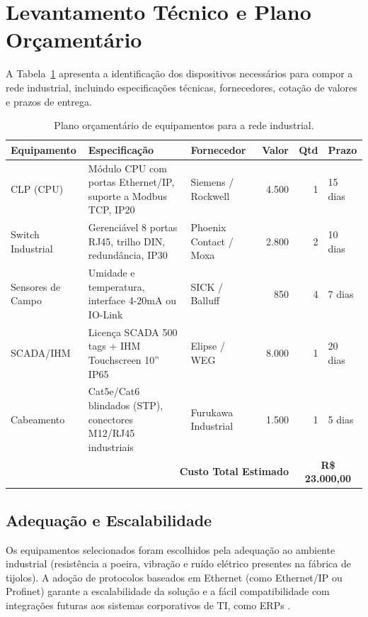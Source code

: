 \documentclass[12pt,a4paper,oneside]{article}
\begin{document}
\section{Levantamento Técnico e Plano Orçamentário}

A Tabela~\ref{tab:orcamento} apresenta a identificação dos dispositivos necessários para compor a rede industrial, incluindo especificações técnicas, fornecedores, cotação de valores e prazos de entrega.

\begin{table}[htb]
  \centering
  \caption{Plano orçamentário de equipamentos para a rede industrial.}
  \label{tab:orcamento}
  \begin{tabular}{p{3cm}p{4cm}p{2.5cm}r r p{2cm}}
    \toprule
    \textbf{Equipamento} & \textbf{Especificação} & \textbf{Fornecedor} & \textbf{Valor} & \textbf{Qtd} & \textbf{Prazo} \\
    \midrule
    CLP (CPU) & Módulo CPU com portas Ethernet/IP, suporte a Modbus TCP, IP20 & Siemens / Rockwell & 4.500 & 1 & 15 dias \\
    \addlinespace
    Switch Industrial & Gerenciável 8 portas RJ45, trilho DIN, redundância, IP30 & Phoenix Contact / Moxa & 2.800 & 2 & 10 dias \\
    \addlinespace
    Sensores de Campo & Umidade e temperatura, interface 4-20mA ou IO-Link & SICK / Balluff & 850 & 4 & 7 dias \\
    \addlinespace
    SCADA/IHM & Licença SCADA 500 tags + IHM Touchscreen 10'' IP65 & Elipse / WEG & 8.000 & 1 & 20 dias \\
    \addlinespace
    Cabeamento & Cat5e/Cat6 blindados (STP), conectores M12/RJ45 industriais & Furukawa Industrial & 1.500 & 1 & 5 dias \\
    \midrule
    \multicolumn{4}{r}{\textbf{Custo Total Estimado}} & \multicolumn{2}{c}{\textbf{R\$ 23.000,00}} \\
    \bottomrule
  \end{tabular}
\end{table}

\subsection{Adequação e Escalabilidade}

Os equipamentos selecionados foram escolhidos pela adequação ao ambiente industrial (resistência a poeira, vibração e ruído elétrico presentes na fábrica de tijolos). A adoção de protocolos baseados em Ethernet (como Ethernet/IP ou Profinet) garante a escalabilidade da solução e a fácil compatibilidade com integrações futuras aos sistemas corporativos de TI, como ERPs \cite{lugli2009}.
\end{document}
